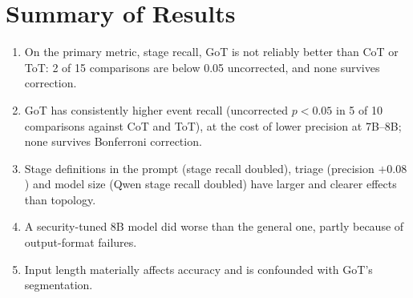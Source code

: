 \section{Summary of Results}
\begin{enumerate}
\item On the primary metric, stage recall, GoT is not reliably better than CoT or ToT: 2 of 15 comparisons are below 0.05 uncorrected, and none survives correction.
\item GoT has consistently higher event recall (uncorrected $p<0.05$ in 5 of 10 comparisons against CoT and ToT), at the cost of lower precision at 7B--8B; none survives Bonferroni correction.
\item Stage definitions in the prompt (stage recall doubled), triage (precision $+0.08$) and model size (Qwen stage recall doubled) have larger and clearer effects than topology.
\item A security-tuned 8B model did worse than the general one, partly because of output-format failures.
\item Input length materially affects accuracy and is confounded with GoT's segmentation.
\end{enumerate}

